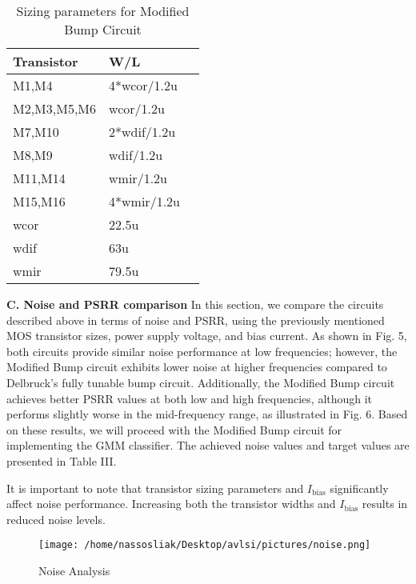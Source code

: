 \documentclass[conference]{IEEEtran}
\begin{document}
\begin{table}[!h]
    \centering
\large
\begin{tabular}{|p{2.5cm}|p{2.5cm}|p{2.5cm}|}
        \hline
        \textbf{Transistor} & \textbf{W/L}\\
        \hline
         M1,M4   & 4*wcor/1.2u\\
        \hline
        M2,M3,M5,M6   &  wcor/1.2u\\
        \hline
         M7,M10   &   2*wdif/1.2u\\
        \hline
         M8,M9   & wdif/1.2u \\
        \hline
         M11,M14   & wmir/1.2u \\
        \hline
         M15,M16   & 4*wmir/1.2u \\
        \hline
  wcor &   22.5u\\
        \hline
  wdif  &   63u\\
        \hline
  wmir   & 79.5u\\
        \hline

    \end{tabular}
\vspace{0.5cm}
    \caption{Sizing parameters for Modified Bump Circuit}

\end{table}

\textbf{C. Noise and PSRR comparison}
In this section, we compare the circuits described above in terms of noise and PSRR, using the previously mentioned MOS transistor sizes, power supply voltage, and bias current. As shown in Fig. 5, both circuits provide similar noise performance at low frequencies; however, the Modified Bump circuit exhibits lower noise at higher frequencies compared to Delbruck's fully tunable bump circuit. Additionally, the Modified Bump circuit achieves better PSRR values at both low and high frequencies, although it performs slightly worse in the mid-frequency range, as illustrated in Fig. 6. Based on these results, we will proceed with the Modified Bump circuit for implementing the GMM classifier. The achieved noise values and target values are presented in Table III. 

It is important to note that transistor sizing parameters and \(I_{\text{bias}}\) significantly affect noise performance. Increasing both the transistor widths and \(I_{\text{bias}}\) results in reduced noise levels.\\


\begin{figure}[!h]
    \centering
    \texttt{[image: /home/nassosliak/Desktop/avlsi/pictures/noise.png]}
    \caption{Noise Analysis}
    \label{fig:noise}
\end{figure}
\end{document}
